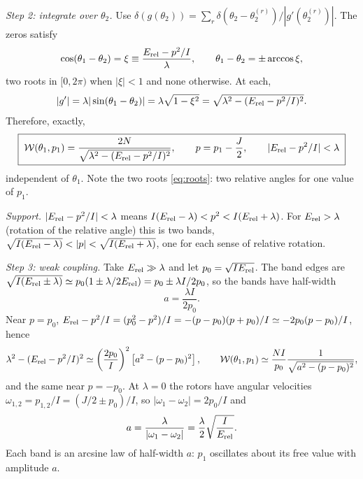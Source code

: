 \documentclass[aps,pra,onecolumn,notitlepage,nofootinbib,11pt]{revtex4-2}
\newcommand{\Erel}{E_{\rm rel}}
\newcommand{\Wc}{\mathcal{W}}
\begin{document}
\emph{Step 2: integrate over $\theta_{2}$.} Use
$\delta(g(\theta_{2}))=\sum_{r}\delta(\theta_{2}-\theta_{2}^{(r)})/|g'(\theta_{2}^{(r)})|$.
The zeros satisfy
\begin{equation}
\cos(\theta_{1}-\theta_{2})=\xi\equiv\frac{\Erel-p^{2}/I}{\lambda},\qquad
\theta_{1}-\theta_{2}=\pm\arccos\xi,
\label{eq:roots}
\end{equation}
two roots in $[0,2\pi)$ when $|\xi|<1$ and none otherwise. At each,
\begin{equation}
|g'|=\lambda|\sin(\theta_{1}-\theta_{2})|=\lambda\sqrt{1-\xi^{2}}
=\sqrt{\lambda^{2}-(\Erel-p^{2}/I)^{2}}.
\end{equation}
Therefore, exactly,
\begin{equation}
\boxed{\;\Wc(\theta_{1},p_{1})=\frac{2N}{\sqrt{\lambda^{2}-(\Erel-p^{2}/I)^{2}}},
\qquad p=p_{1}-\frac{J}{2},\qquad |\Erel-p^{2}/I|<\lambda\;}
\label{eq:Wexact}
\end{equation}
independent of $\theta_{1}$. Note the two roots \eqref{eq:roots}: two relative angles
for one value of $p_{1}$.

\emph{Support.} $|\Erel-p^{2}/I|<\lambda$ means $I(\Erel-\lambda)<p^{2}<I(\Erel+\lambda)$.
For $\Erel>\lambda$ (rotation of the relative angle) this is two bands,
$\sqrt{I(\Erel-\lambda)}<|p|<\sqrt{I(\Erel+\lambda)}$, one for each sense of relative
rotation.

\emph{Step 3: weak coupling.} Take $\Erel\gg\lambda$ and let $p_{0}=\sqrt{I\Erel}$.
The band edges are
$\sqrt{I(\Erel\pm\lambda)}\simeq p_{0}(1\pm\lambda/2\Erel)=p_{0}\pm\lambda I/2p_{0}$,
so the bands have half-width
\begin{equation}
a=\frac{\lambda I}{2p_{0}} .
\label{eq:a}
\end{equation}
Near $p=p_{0}$, $\Erel-p^{2}/I=(p_{0}^{2}-p^{2})/I=-(p-p_{0})(p+p_{0})/I\simeq
-2p_{0}(p-p_{0})/I$, hence
\begin{equation}
\lambda^{2}-(\Erel-p^{2}/I)^{2}\simeq\left(\frac{2p_{0}}{I}\right)^{2}
\left[a^{2}-(p-p_{0})^{2}\right],\qquad
\Wc(\theta_{1},p_{1})\simeq\frac{NI}{p_{0}}\frac{1}{\sqrt{a^{2}-(p-p_{0})^{2}}},
\label{eq:Wlin}
\end{equation}
and the same near $p=-p_{0}$. At $\lambda=0$ the rotors have angular velocities
$\omega_{1,2}=p_{1,2}/I=(J/2\pm p_{0})/I$, so $|\omega_{1}-\omega_{2}|=2p_{0}/I$ and
\begin{equation}
a=\frac{\lambda}{|\omega_{1}-\omega_{2}|}=\frac{\lambda}{2}\sqrt{\frac{I}{\Erel}}.
\label{eq:a2}
\end{equation}
Each band is an arcsine law of half-width $a$: $p_{1}$ oscillates about its free
value with amplitude $a$.
\end{document}
